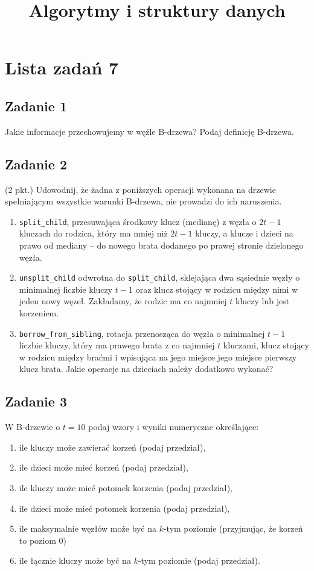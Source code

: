\documentclass{article}
\begin{document}
\title{Algorytmy i struktury danych}
\author{}
\date{}
\maketitle

\section*{Lista zadań 7}

\subsection*{Zadanie 1}
Jakie informacje przechowujemy w węźle B-drzewa? Podaj definicję B-drzewa.

\subsection*{Zadanie 2}
(2 pkt.) Udowodnij, że żadna z poniższych operacji wykonana na drzewie spełniającym wszystkie warunki B-drzewa, nie
prowadzi do ich naruszenia.
\begin{enumerate}[label=(\alph*)]
    \item \verb|split_child|, przesuwająca środkowy klucz (medianę) z węzła o $2t-1$ kluczach do rodzica, który ma
          mniej niż $2t-1$ kluczy, a klucze i dzieci na prawo od mediany -- do nowego brata dodanego po prawej stronie
          dzielonego węzła.
    \item \verb|unsplit_child| odwrotna do \verb|split_child|, sklejająca dwa sąsiednie węzły o minimalnej liczbie
          kluczy $t-1$ oraz klucz stojący w rodzicu między nimi w jeden nowy węzeł. Zakładamy, że rodzic ma co
          najmniej $t$ kluczy lub jest korzeniem.
    \item \verb|borrow_from_sibling|, rotacja przenosząca do węzła o minimalnej $t-1$ liczbie kluczy, który ma
          prawego brata z co najmniej $t$ kluczami, klucz stojący w rodzicu między braćmi i wpisująca na jego miejsce
          jego miejsce pierwszy klucz brata. Jakie operacje na dzieciach należy dodatkowo wykonać?
\end{enumerate}

\subsection*{Zadanie 3}
W B-drzewie o $t=10$ podaj wzory i wyniki numeryczne określające:
\begin{enumerate}[label=(\alph*)]
    \item ile kluczy może zawierać korzeń (podaj przedział),
    \item ile dzieci może mieć korzeń (podaj przedział),
    \item ile kluczy może mieć potomek korzenia (podaj przedział),
    \item ile dzieci może mieć potomek korzenia (podaj przedział),
    \item ile maksymalnie węzłów może być na $k$-tym poziomie (przyjmując, że korzeń to poziom $0$)
    \item ile łącznie kluczy może być na $k$-tym poziomie (podaj przedział).
\end{enumerate}
\end{document}
